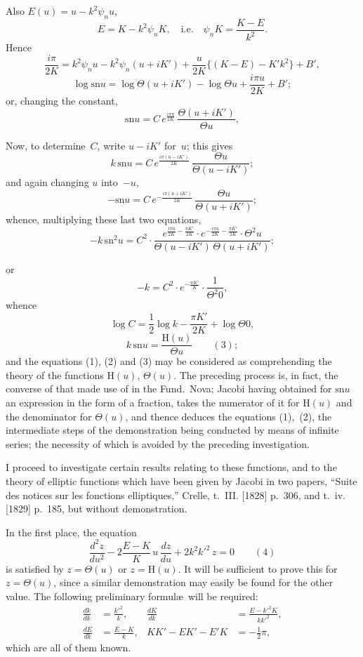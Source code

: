 \documentclass[11pt,a4paper]{article}
\newcommand{\sno}{\mathrm{sn}}
\begin{document}
Also $E(u) = u - k^2\psi_n u$,
\[
E = K - k^2\psi_n K, \quad \text{i.e.}\quad \psi_n K = \frac{K-E}{k^2}.
\]
Hence
\[
\frac{i\pi}{2K} = k^2\psi_n u - k^2\psi_n(u+iK') + \frac{u}{2K}\{(K-E) - K'k^2\} + B',
\]
\[
\log \sno u = \log \Theta(u+iK') - \log \Theta u + \frac{i\pi u}{2K} + B';
\]
or, changing the constant,
\[
\sno u = C \, e^{\frac{i\pi u}{2K}} \, \frac{\Theta(u+iK')}{\Theta u},
\]

Now, to determine~$C$, write $u-iK'$ for~$u$; this gives
\[
k\,\sno u = C \, e^{\frac{i\pi(u-iK')}{2K}} \, \frac{\Theta u}{\Theta(u-iK')};
\]
and again changing $u$ into~$-u$,
\[
-\sno u = C \, e^{-\frac{i\pi(u+iK')}{2K}} \, \frac{\Theta u}{\Theta(u+iK')};
\]
whence, multiplying these last two equations,
\[
-k\,\sno^2 u = C^2 \cdot \frac{e^{\frac{i\pi u}{2K} - \frac{\pi K'}{2K}} \cdot e^{-\frac{i\pi u}{2K} - \frac{\pi K'}{2K}} \cdot \Theta^2 u}{\Theta(u-iK')\,\Theta(u+iK')};
\]

\newpage
or
\[
-k = C^2 \cdot e^{-\frac{\pi K'}{K}} \cdot \frac{1}{\Theta^2 0},
\]
whence
\[
\log C = \frac{1}{2}\log k - \frac{\pi K'}{2K} + \log \Theta 0,
\]
\[
k\,\sno u = \frac{\mathrm{H}(u)}{\Theta u} \qquad(3);
\]
and the equations (1), (2) and (3) may be considered as comprehending the theory of the functions $\mathrm{H}(u)$, $\Theta(u)$. The preceding process is, in fact, the converse of that made use of in the Fund.\ Nova; Jacobi having obtained for $\sno u$ an expression in the form of a fraction, takes the numerator of it for $\mathrm{H}(u)$ and the denominator for $\Theta(u)$, and thence deduces the equations (1),~(2), the intermediate steps of the demonstration being conducted by means of infinite series; the necessity of which is avoided by the preceding investigation.

I proceed to investigate certain results relating to these functions, and to the theory of elliptic functions which have been given by Jacobi in two papers, ``Suite des notices sur les fonctions elliptiques,'' Crelle, t.~III. [1828] p.~306, and t.~iv. [1829] p.~185, but without demonstration.

In the first place, the equation
\[
\frac{d^2z}{du^2} - 2\frac{E-K}{K}\,u\,\frac{dz}{du} + 2k^2k'^2\,z = 0 \qquad(4)
\]
is satisfied by $z = \Theta(u)$ or $z = \mathrm{H}(u)$. It will be sufficient to prove this for $z = \Theta(u)$, since a similar demonstration may easily be found for the other value. The following preliminary formul\ae\ will be required:
\begin{align*}
\frac{dk}{dk} &= \frac{k'^2}{k}, & \frac{dK}{dk} &= \frac{E-k'^2K}{kk'^2},\\
\frac{dE}{dk} &= \frac{E-K}{k}, &
KK' - EK' - E'K &= -\tfrac{1}{2}\pi,
\end{align*}
which are all of them known.
\end{document}
